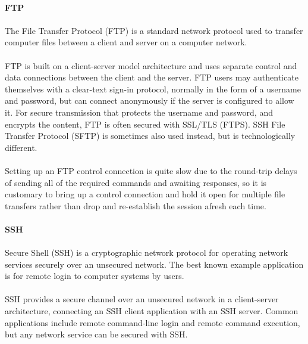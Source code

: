 \paragraph{} \textbf{FTP}
\paragraph{}
The File Transfer Protocol (FTP) is a standard network protocol used to transfer computer files between a client and server on a computer network.
\paragraph{}
FTP is built on a client-server model architecture and uses separate control and data connections between the client and the server. FTP users may authenticate themselves with a clear-text sign-in protocol, normally in the form of a username and password, but can connect anonymously if the server is configured to allow it. For secure transmission that protects the username and password, and encrypts the content, FTP is often secured with SSL/TLS (FTPS). SSH File Transfer Protocol (SFTP) is sometimes also used instead, but is technologically different.
\paragraph{}
Setting up an FTP control connection is quite slow due to the round-trip delays of sending all of the required commands and awaiting responses, so it is customary to bring up a control connection and hold it open for multiple file transfers rather than drop and re-establish the session afresh each time. 

\paragraph{} \textbf{SSH}
\paragraph{} 
Secure Shell (SSH) is a cryptographic network protocol for operating network services securely over an unsecured network. The best known example application is for remote login to computer systems by users.
\paragraph{}
SSH provides a secure channel over an unsecured network in a client-server architecture, connecting an SSH client application with an SSH server. Common applications include remote command-line login and remote command execution, but any network service can be secured with SSH. 

